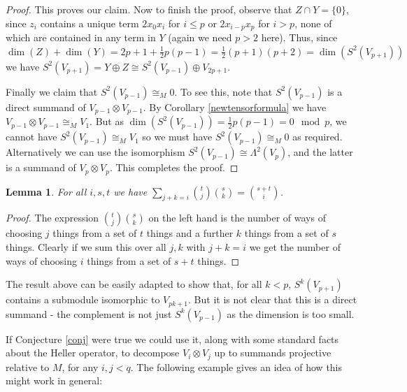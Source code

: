 \documentclass[a4paper]{amsart}
\newtheorem{Lemma}{Lemma}[section]
\theoremstyle{definition}
\theoremstyle{remark}
\theoremstyle{Acknowledgments}
\begin{document}
\begin{proof}
This proves our claim. Now to finish the proof, observe that $Z \cap Y = \{0\}$, since $z_i$ contains a unique term $2x_0x_i$ for $i \leq p$ or $2x_{i-p}x_p$ for $i>p$, none of which are contained in any term in $Y$ (again we need $p>2$ here). Thus, since $\dim(Z)+\dim(Y) = 2p+1+\frac12 p(p-1) = \frac12 (p+1)(p+2) = \dim(S^2(V_{p+1}))$ we have $S^2(V_{p+1}) = Y \oplus Z \cong S^2(V_{p-1}) \oplus V_{2p+1}$.

Finally we claim that $S^2(V_{p-1}) \cong_M 0$. To see this, note that $S^2(V_{p-1})$ is a direct summand of $V_{p-1} \otimes V_{p-1}$. By Corollary \ref{newtensorformula} we have $V_{p-1} \otimes V_{p-1} \cong_M V_1$. But as $\dim( S^2(V_{p-1}) ) = \frac12 p(p-1) = 0 \mod p$, we cannot have 
$S^2(V_{p-1}) \cong_M V_1$ so we must have  $S^2(V_{p-1}) \cong_M 0$ as required. Alternatively we can use the isomorphism $S^2(V_{p-1}) \cong \Lambda^2(V_p)$, and the latter is a summand of $V_p \otimes V_p$. This completes the proof.
\end{proof}

\begin{Lemma}\label{morecombs}
For all $i,s,t$ we have  $\sum_{j+k=i} \binom{t}{j}\binom{s}{k} =  \binom{s+t}{i}$.
\end{Lemma}

\begin{proof}
The expression $ \binom{t}{j}\binom{s}{k} $ on the left hand is the number of ways of choosing $j$ things from a set of $t$ things and a further $k$ things from a set of $s$ things. Clearly if we sum this over all $j,k$ with $j+k=i$ we get the number of ways of choosing $i$ things from a set of $s+t$ things.
\end{proof}

The result above can be easily adapted to show that, for all $k<p$, $S^k(V_{p+1})$ contains a submodule isomorphic to $V_{pk+1}$. But it is not clear that this is a direct summand - the complement is not just $S^k(V_{p-1})$ as the dimension is too small. 

If Conjecture \ref{conj} were true we could use it, along with some standard facts about the Heller operator, to decompose $V_i \otimes V_j$ up to summands projective relative to $M$, for any $i,j<q$. The following example gives an idea of how this might work in general:
\end{document}
